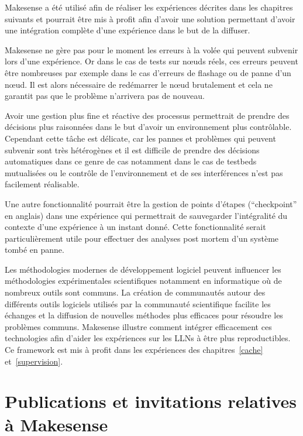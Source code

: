 Makesense a été utilisé afin de réaliser les expériences décrites dans les chapitres suivants et pourrait être mis à profit afin d'avoir une solution permettant d'avoir une intégration complète d'une expérience dans le but de la diffuser.

Makesense ne gère pas pour le moment les erreurs à la volée qui peuvent subvenir lors d'une expérience.
Or dans le cas de tests sur nœuds réels, ces erreurs peuvent être nombreuses par exemple dans le cas d'erreurs de flashage ou de panne d'un nœud.
Il est alors nécessaire de redémarrer le nœud brutalement et cela ne garantit pas que le problème n'arrivera pas de nouveau.

Avoir une gestion plus fine et réactive des processus permettrait de prendre des décisions plus raisonnées dans le but d'avoir un environnement plus contrôlable.
Cependant cette tâche est délicate, car les pannes et problèmes qui peuvent subvenir sont très hétérogènes et il est difficile de prendre des décisions automatiques dans ce genre de cas notamment dans le cas de testbeds mutualisées ou le contrôle de l'environnement et de ses interférences n'est pas facilement réalisable.

Une autre fonctionnalité pourrait être la gestion de points d'étapes (``checkpoint'' en anglais) dans une expérience qui permettrait de sauvegarder l'intégralité du contexte d'une expérience à un instant donné.
Cette fonctionnalité serait particulièrement utile pour effectuer des analyses post mortem d'un système tombé en panne.

Les méthodologies modernes de développement logiciel peuvent influencer les méthodologies expérimentales scientifiques notamment en informatique où de nombreux outils sont communs.
La création de communautés autour des différents outils logiciels utilisés par la communauté scientifique facilite les échanges et la diffusion de nouvelles méthodes plus efficaces pour résoudre les problèmes communs.
Makesense illustre comment intégrer efficacement ces technologies afin d'aider les expériences sur les \ac{LLN}s à être plus reproductibles.
Ce framework est mis à profit dans les expériences des chapitres~\ref{cache} et~\ref{supervision}.

\section*{Publications et invitations relatives à Makesense}

